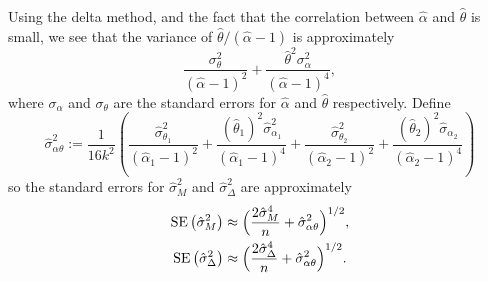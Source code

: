 \documentclass[
]{article}
\begin{document}
Using the delta method, and the fact that the correlation between \(\hat\alpha\) and \(\hat\theta\) is small, we see that the variance of \(\hat\theta/(\hat\alpha-1)\) is approximately
\[
  \frac{\sigma_\theta^2}{(\hat\alpha-1)^2} + \frac{\hat\theta^2\sigma_\alpha^2}{(\hat\alpha-1)^4},
\]
where \(\sigma_\alpha\) and \(\sigma_\theta\) are the standard errors for \(\hat\alpha\) and \(\hat\theta\) respectively. Define
\[
  \hat\sigma_{\alpha\theta}^2 := \frac{1}{16k^2} \left(\frac{\hat\sigma_{\theta_1}^2}{(\hat\alpha_1-1)^2} + \frac{(\hat\theta_1)^2\hat\sigma_{\alpha_1}^2}{(\hat\alpha_1-1)^4} + \frac{\hat\sigma_{\theta_2}^2}{(\hat\alpha_2-1)^2} + \frac{(\hat\theta_2)^2\hat\sigma_{\alpha_2}}{(\hat\alpha_2-1)^4}\right)
\]
so the standard errors for \(\hat\sigma_M^2\) and \(\hat\sigma_\Delta^2\) are approximately
\begin{align*}
  \operatorname{SE}\left(\hat\sigma_M^2\right)&\approx \Bigl(\frac{2\hat\sigma_M^4}{n} + \hat\sigma_{\alpha\theta}^2 \Bigr)^{1/2},\\
  \operatorname{SE}\left(\hat\sigma_\Delta^2\right)&\approx \Bigl(\frac{2\hat\sigma_\Delta^4}{n} + \hat\sigma_{\alpha\theta}^2 \Bigr)^{1/2}.
\end{align*}
\end{document}
